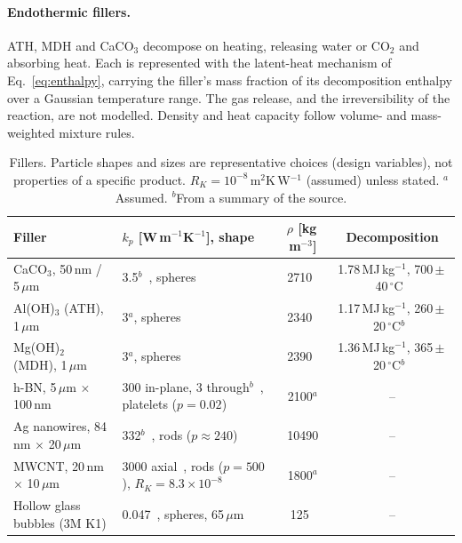 \documentclass[11pt]{article}
\begin{document}
\paragraph{Endothermic fillers.} ATH, MDH and CaCO$_3$ decompose on heating, releasing
water or CO$_2$ and absorbing heat. Each is represented with the latent-heat mechanism of
Eq.~\eqref{eq:enthalpy}, carrying the filler's mass fraction of its decomposition
enthalpy over a Gaussian temperature range. The gas release, and the irreversibility of
the reaction, are not modelled. Density and heat capacity follow volume- and
mass-weighted mixture rules.

\begin{table}[!htbp]
  \centering\small
  \caption{Fillers. Particle shapes and sizes are representative choices (design
  variables), not properties of a specific product. $R_K = 10^{-8}$\,m$^2$K\,W$^{-1}$
  (assumed) unless stated. $^a$Assumed. $^b$From a summary of the source.}
  \label{tab:fillers}
  \begin{tabularx}{\linewidth}{@{}lXcc@{}}
    \toprule
    Filler & $k_p$ [W\,m$^{-1}$K$^{-1}$], shape & $\rho$ [kg\,m$^{-3}$]
      & Decomposition \\
    \midrule
    CaCO$_3$, 50\,nm / 5\,$\mu$m & 3.5$^b$~\cite{horai1971}, spheres & 2710~\cite{mineraldensity}
      & 1.78\,MJ\,kg$^{-1}$, 700\,$\pm$\,40\,$^\circ$C~\cite{rodrigueznavarro2009} \\
    Al(OH)$_3$ (ATH), 1\,$\mu$m & 3$^a$, spheres & 2340~\cite{mineraldensity}
      & 1.17\,MJ\,kg$^{-1}$, 260\,$\pm$\,20\,$^\circ$C$^b$~\cite{sd_hydroxides} \\
    Mg(OH)$_2$ (MDH), 1\,$\mu$m & 3$^a$, spheres & 2390~\cite{mineraldensity}
      & 1.36\,MJ\,kg$^{-1}$, 365\,$\pm$\,20\,$^\circ$C$^b$~\cite{sd_hydroxides} \\
    h-BN, 5\,$\mu$m $\times$ 100\,nm & 300 in-plane, 3 through$^b$~\cite{huang2018review},
      platelets ($p = 0.02$) & 2100$^a$ & -- \\
    Ag nanowires, 84\,nm $\times$ 20\,$\mu$m & 332$^b$~\cite{agnw_nsf}, rods ($p \approx 240$)
      & 10490 & -- \\
    MWCNT, 20\,nm $\times$ 10\,$\mu$m & 3000 axial~\cite{kim2001cnt}, rods ($p = 500$),
      $R_K = 8.3\times10^{-8}$~\cite{huxtable2003} & 1800$^a$ & -- \\
    Hollow glass bubbles (3M K1) & 0.047~\cite{m3k1}, spheres, 65\,$\mu$m & 125~\cite{m3k1} & -- \\
    \bottomrule
  \end{tabularx}
\end{table}
\end{document}
